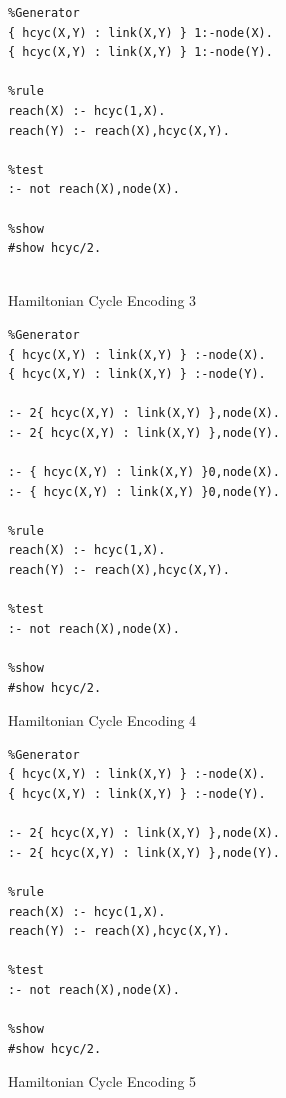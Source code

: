 \documentclass{new_tlp}
\begin{document}
\begin{figure}[!h]
\figrule
\begin{center}
\begin{verbatim}
%Generator
{ hcyc(X,Y) : link(X,Y) } 1:-node(X).
{ hcyc(X,Y) : link(X,Y) } 1:-node(Y).

%rule
reach(X) :- hcyc(1,X).
reach(Y) :- reach(X),hcyc(X,Y).

%test
:- not reach(X),node(X).

%show
#show hcyc/2.


\end{verbatim}
\end{center}
\caption{Hamiltonian Cycle Encoding 3}\label{enc3}
\figrule
\end{figure}

\begin{figure}[!h]
\figrule
\begin{center}
\begin{verbatim}
%Generator
{ hcyc(X,Y) : link(X,Y) } :-node(X).
{ hcyc(X,Y) : link(X,Y) } :-node(Y).

:- 2{ hcyc(X,Y) : link(X,Y) },node(X).
:- 2{ hcyc(X,Y) : link(X,Y) },node(Y).

:- { hcyc(X,Y) : link(X,Y) }0,node(X).
:- { hcyc(X,Y) : link(X,Y) }0,node(Y).

%rule
reach(X) :- hcyc(1,X).
reach(Y) :- reach(X),hcyc(X,Y).

%test
:- not reach(X),node(X).

%show
#show hcyc/2.

\end{verbatim}
\end{center}
\caption{Hamiltonian Cycle Encoding 4}\label{enc4}
\figrule
\end{figure}

\begin{figure}[!h]
\figrule
\begin{center}
\begin{verbatim}
%Generator
{ hcyc(X,Y) : link(X,Y) } :-node(X).
{ hcyc(X,Y) : link(X,Y) } :-node(Y).

:- 2{ hcyc(X,Y) : link(X,Y) },node(X).
:- 2{ hcyc(X,Y) : link(X,Y) },node(Y).

%rule
reach(X) :- hcyc(1,X).
reach(Y) :- reach(X),hcyc(X,Y).

%test
:- not reach(X),node(X).

%show
#show hcyc/2.
\end{verbatim}
\end{center}
\caption{Hamiltonian Cycle Encoding 5}\label{enc5}
\figrule
\end{figure}
\end{document}
